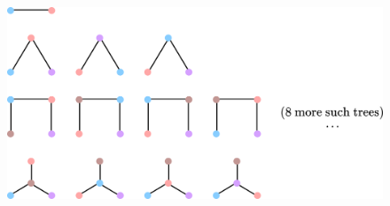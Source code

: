\begin{figure}[H]
    \centering
    \includegraphics[width=0.9\linewidth]{Images/Figure29.png}
    \caption{}
    \label{f:Cayley Trees}
\end{figure}

